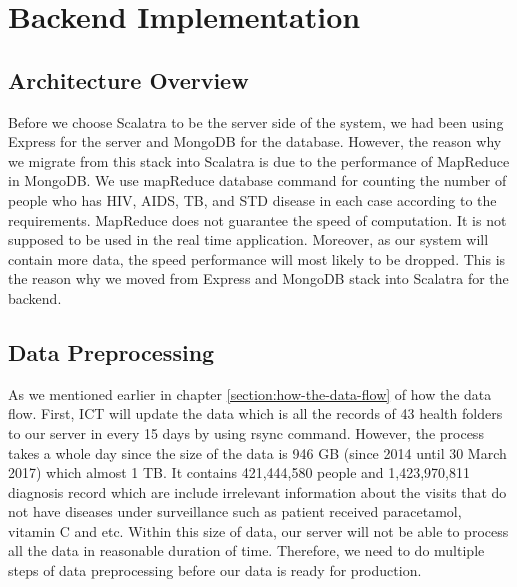 \chapter{Backend Implementation}

    \section{Architecture Overview}
        Before we choose Scalatra to be the server side of the system, we had been using Express\cite{expressjs} for the server and MongoDB\cite{mongodb} for the database. However, the reason why we migrate from this stack into Scalatra\cite{scalatra} is due to the performance of MapReduce in MongoDB. We use mapReduce database command for counting the number of people who has HIV, AIDS, TB, and STD disease in each case according to the requirements. MapReduce does not guarantee the speed of computation. It is not supposed to be used in the real time application. Moreover, as our system will contain more data, the speed performance will most likely to be dropped. This is the reason why we moved from Express and MongoDB stack into Scalatra for the backend.
        
    \section{Data Preprocessing}
    
        
        As we mentioned earlier in chapter \ref{section:how-the-data-flow} of how the data flow. First, ICT will update the data which is all the records of 43 health folders to our server in every 15 days by using rsync command. However, the process takes a whole day since the size of the data is 946 GB (since 2014 until 30 March 2017) which almost 1 TB. It contains 421,444,580 people and 1,423,970,811 diagnosis record which are include irrelevant information about the visits that do not have diseases under surveillance such as patient received paracetamol, vitamin C and etc. Within this size of data, our server will not be able to process all the data in reasonable duration of time. Therefore, we need to do multiple steps of data preprocessing before our data is ready for production.
        

